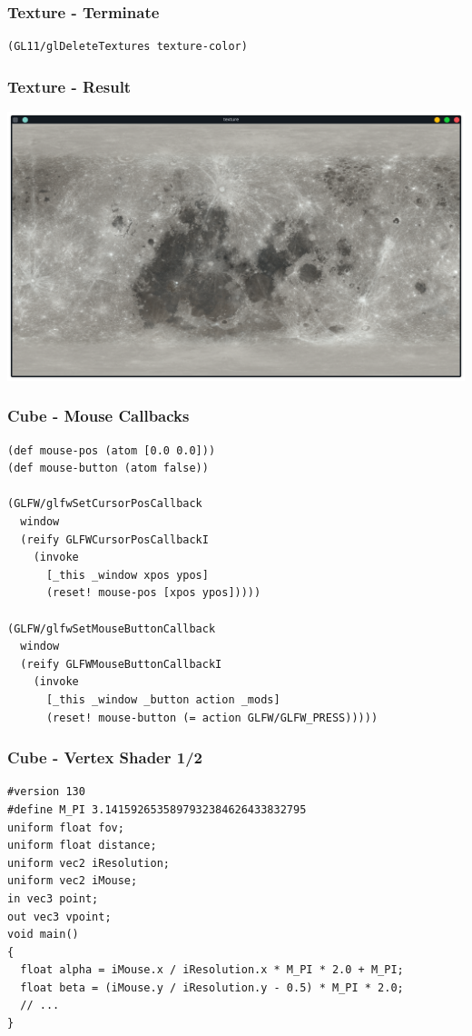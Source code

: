 \documentclass[aspectratio=169,11pt,xcolor=dvipsnames]{beamer}
\begin{document}
\begin{frame}[fragile]
  \frametitle{Texture {-} Terminate}
  \begin{verbatim}
(GL11/glDeleteTextures texture-color)
  \end{verbatim}
\end{frame}

\begin{frame}
  \frametitle{Texture {-} Result}
  \begin{center}
    \includegraphics[width=.8\textwidth]{texture}
  \end{center}
\end{frame}

\begin{frame}[fragile]
  \frametitle{Cube {-} Mouse Callbacks}
  \begin{verbatim}
(def mouse-pos (atom [0.0 0.0]))
(def mouse-button (atom false))

(GLFW/glfwSetCursorPosCallback
  window
  (reify GLFWCursorPosCallbackI
    (invoke
      [_this _window xpos ypos]
      (reset! mouse-pos [xpos ypos]))))

(GLFW/glfwSetMouseButtonCallback
  window
  (reify GLFWMouseButtonCallbackI
    (invoke
      [_this _window _button action _mods]
      (reset! mouse-button (= action GLFW/GLFW_PRESS)))))
  \end{verbatim}
\end{frame}

\begin{frame}[fragile]
  \frametitle{Cube {-} Vertex Shader 1/2}
  \begin{verbatim}
#version 130
#define M_PI 3.1415926535897932384626433832795
uniform float fov;
uniform float distance;
uniform vec2 iResolution;
uniform vec2 iMouse;
in vec3 point;
out vec3 vpoint;
void main()
{
  float alpha = iMouse.x / iResolution.x * M_PI * 2.0 + M_PI;
  float beta = (iMouse.y / iResolution.y - 0.5) * M_PI * 2.0;
  // ...
}
  \end{verbatim}
\end{frame}
\end{document}
